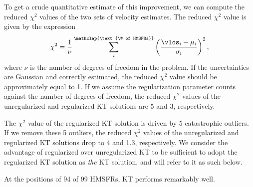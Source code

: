 To get a crude quantitative estimate of this improvement, we can compute the reduced $\chi^2$ values of the two sets of velocity estimates. 
The reduced $\chi^2$ value is given by the expression
\begin{equation}
\chi^2 = \frac{1}{\nu} \sum_i^\mathclap{\text{\# of HMSFRs}} \left(\frac{\vlos_i - \mu_i}{\sigma_i} \right)^2, 
\end{equation}
where $\nu$ is the number of degrees of freedom in the problem.
If the uncertainties are Gaussian and correctly estimated, the reduced $\chi^2$ value should be approximately equal to 1.
If we assume the regularization parameter counts against the number of degrees of freedom, the reduced $\chi^2$ values of the unregularized and regularized KT solutions are 5 and 3, respectively.

The $\chi^2$ value of the regularized KT solution is driven by 5 catastrophic outliers. 
If we remove these 5 outliers, the reduced $\chi^2$ values of the unregularized and regularized KT solutions drop to 4 and 1.3, respectively. 
We consider the advantage of regularized over unregularized KT to be sufficient to adopt the regularized KT solution as \emph{the} KT solution, and will refer to it as such below.

At the positions of 94 of 99 HMSFRs, KT performs remarkably well. 
